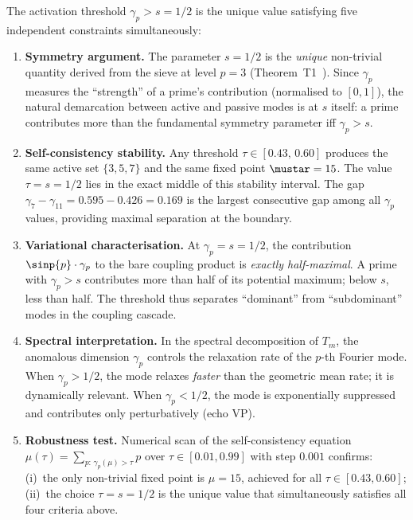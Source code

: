 \documentclass[12pt,a4paper]{article}
\begin{document}
\begin{remark}
\label{prop:threshold_natural}
The activation threshold $\gamma_p > s = 1/2$ is the unique value
satisfying five independent constraints simultaneously:

\begin{enumerate}[nosep]
\item \textbf{Symmetry argument.}
  The parameter $s = 1/2$ is the \emph{unique} non-trivial quantity
  derived from the sieve at level $p = 3$ (Theorem~T1~\cite{companion_M1}).
  Since $\gamma_p$ measures the ``strength'' of a prime's contribution
  (normalised to $[0,1]$), the natural demarcation between
  active and passive modes is at $s$ itself:
  a prime contributes more than the fundamental symmetry parameter
  iff $\gamma_p > s$.

\item \textbf{Self-consistency stability.}
  Any threshold $\tau \in [0.43,\, 0.60]$ produces the same active
  set $\{3, 5, 7\}$ and the same fixed point $\mustar = 15$.
  The value $\tau = s = 1/2$ lies in the exact middle of this
  stability interval.
  The gap $\gamma_7 - \gamma_{11} = 0.595 - 0.426 = 0.169$
  is the largest consecutive gap among all $\gamma_p$ values,
  providing maximal separation at the boundary.

\item \textbf{Variational characterisation.}
  At $\gamma_p = s = 1/2$, the contribution
  $\sinp{p} \cdot \gamma_p$ to the bare coupling product is
  \emph{exactly half-maximal}.
  A prime with $\gamma_p > s$ contributes more than half
  of its potential maximum; below $s$, less than half.
  The threshold thus separates ``dominant'' from ``subdominant''
  modes in the coupling cascade.

\item \textbf{Spectral interpretation.}
  In the spectral decomposition of $T_m$, the anomalous
  dimension $\gamma_p$ controls the relaxation rate of the
  $p$-th Fourier mode.
  When $\gamma_p > 1/2$, the mode relaxes \emph{faster}
  than the geometric mean rate; it is dynamically relevant.
  When $\gamma_p < 1/2$, the mode is exponentially suppressed
  and contributes only perturbatively (echo VP).

\item \textbf{Robustness test.}
  Numerical scan of the self-consistency equation
  $\mu(\tau) = \sum_{p:\,\gamma_p(\mu) > \tau} p$ over
  $\tau \in [0.01, 0.99]$ with step $0.001$ confirms:
  (i)~the only non-trivial fixed point is $\mu = 15$, achieved
  for all $\tau \in [0.43, 0.60]$;
  (ii)~the choice $\tau = s = 1/2$ is the unique value that
  simultaneously satisfies all four criteria above.
\end{enumerate}


\end{remark}
\end{document}

